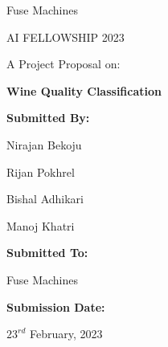 \bigskip
\bigskip
\bigskip
\bigskip
\bigskip
\bigskip


\begin{center}
    
Fuse Machines 

AI FELLOWSHIP 2023

\bigskip
\bigskip
\bigskip
\bigskip
\bigskip
\bigskip
\noindent\makebox[\linewidth]
{\rule{15cm}{0.4pt}}
A Project Proposal on:

\textbf{Wine Quality Classification}
\noindent\makebox[\linewidth]
{\rule{15cm}{0.4pt}}

\bigskip
\bigskip
\bigskip
\bigskip
\bigskip
\bigskip
\bigskip
\bigskip
\textbf{Submitted By:}

Nirajan Bekoju

Rijan Pokhrel

Bishal Adhikari

Manoj Khatri

\bigskip
\bigskip
\bigskip
\bigskip
\textbf{Submitted To:}

Fuse Machines

\bigskip
\bigskip
\bigskip
\bigskip
\textbf{Submission Date:} 

$23^{rd}$ February, 2023

\end{center}

\tableofcontents
\clearpage
\listoffigures
\clearpage
\listoftables
\clearpage